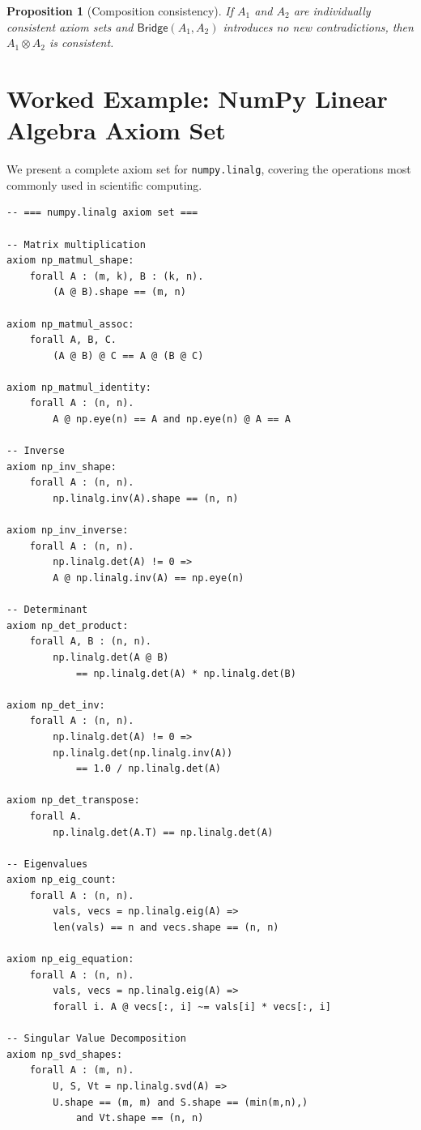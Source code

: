 \documentclass[11pt,a4paper]{report}
\theoremstyle{definition}
\theoremstyle{plain}
\newtheorem{proposition}[definition]{Proposition}
\begin{document}
\begin{proposition}[Composition consistency]
If $A_1$ and $A_2$ are individually consistent axiom sets and
$\mathsf{Bridge}(A_1, A_2)$ introduces no new contradictions, then
$A_1 \otimes A_2$ is consistent.
\end{proposition}

\section{Worked Example: NumPy Linear Algebra Axiom Set}

We present a complete axiom set for \texttt{numpy.linalg}, covering the
operations most commonly used in scientific computing.

\begin{lstlisting}[style=proof]
-- === numpy.linalg axiom set ===

-- Matrix multiplication
axiom np_matmul_shape:
    forall A : (m, k), B : (k, n).
        (A @ B).shape == (m, n)

axiom np_matmul_assoc:
    forall A, B, C.
        (A @ B) @ C == A @ (B @ C)

axiom np_matmul_identity:
    forall A : (n, n).
        A @ np.eye(n) == A and np.eye(n) @ A == A

-- Inverse
axiom np_inv_shape:
    forall A : (n, n).
        np.linalg.inv(A).shape == (n, n)

axiom np_inv_inverse:
    forall A : (n, n).
        np.linalg.det(A) != 0 =>
        A @ np.linalg.inv(A) == np.eye(n)

-- Determinant
axiom np_det_product:
    forall A, B : (n, n).
        np.linalg.det(A @ B)
            == np.linalg.det(A) * np.linalg.det(B)

axiom np_det_inv:
    forall A : (n, n).
        np.linalg.det(A) != 0 =>
        np.linalg.det(np.linalg.inv(A))
            == 1.0 / np.linalg.det(A)

axiom np_det_transpose:
    forall A.
        np.linalg.det(A.T) == np.linalg.det(A)

-- Eigenvalues
axiom np_eig_count:
    forall A : (n, n).
        vals, vecs = np.linalg.eig(A) =>
        len(vals) == n and vecs.shape == (n, n)

axiom np_eig_equation:
    forall A : (n, n).
        vals, vecs = np.linalg.eig(A) =>
        forall i. A @ vecs[:, i] ~= vals[i] * vecs[:, i]

-- Singular Value Decomposition
axiom np_svd_shapes:
    forall A : (m, n).
        U, S, Vt = np.linalg.svd(A) =>
        U.shape == (m, m) and S.shape == (min(m,n),)
            and Vt.shape == (n, n)


\end{lstlisting}
\end{document}
